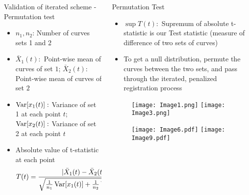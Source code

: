 \documentclass[final]{beamer}
\newlength{\onecolwid}
\begin{document}
\begin{frame}{}
\begin{columns}[t]
\begin{column}{\onecolwid}
\begin{block}{Validation of iterated scheme - Permutation test}
        \begin{itemize}
        \item $n_1, n_2$: Number of curves sets 1 and 2
        \item $\bar{X}_1(t): $ Point-wise mean of curves of set $1$; $\bar{X}_2(t): $ Point-wise mean of curves of set $2$
        \item $\operatorname{Var}[x_1(t)]: $ Variance of set 1 at each point $t$; $\operatorname{Var}[x_2(t)]: $ Variance of set 2 at each point $t$ 
        \item Absolute value of t-statistic at each point 
          $$T(t) = \frac{|\bar{X}_1(t) - \bar{X}_2(t)|}{\sqrt{\frac{1}{n_1}\operatorname{Var}[x_1(t)] + 
            \frac{1}{n_2}\operatorname{Var}[x_2(t)]}}$$ 
        \end{itemize}
      \end{block}
    \end{column}

    \begin{column}{\onecolwid}\vspace{-1in}
      \begin{block}{Permutation Test}
        \begin{itemize}
        \item $\sup{T}(t):$ Supremum of absolute t-statistic is our Test statistic (measure of difference of two sets of curves)
        \item To get a null distribution, permute the curves between the two sets, and pass through the iterated, penalized registration process
        \end{itemize}
        \begin{figure}
          \texttt{[image: Image1.png]}
          \hspace{1in}
          \texttt{[image: Image3.png]}
        \end{figure}
        \begin{figure}
        \texttt{[image: Image6.pdf]}
        \hspace{1in}
        \texttt{[image: Image9.pdf]}
        \end{figure}
      

\end{block}
\end{column}
\end{columns}
\end{frame}
\end{document}
